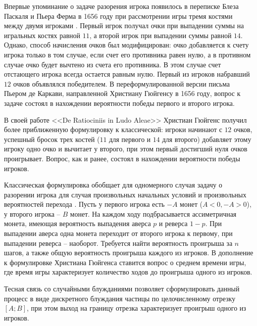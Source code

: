 Впервые упоминание о задаче разорения игрока появилось в переписке Блеза Паскаля и Пьера Ферма в 1656 году при рассмотрении игры тремя костями между двумя игроками \cite{renyi_1980}. Первый игрок получал очки при выпадении суммы на игральных костях равной $11$, а второй игрок при выпадении суммы равной $14$. Однако, способ начисления очков был модифицирован: очко добавляется к счету игрока только в том случае, если счет его противника равен нулю, а в противном случае очко будет вычтено из счета его противника. В этом случае счет отстающего игрока всегда остается равным нулю. Первый из игроков набравший $12$ очков объявлялся победителем. В переформулированной версии письма Пьером де Каркави, направленной Христиану Гюйгенсу в 1656 году, вопрос к задаче состоял в нахождении вероятности победы первого и второго игрока. 

В своей работе <<De Ratiociniis in Ludo Aleae>> Христиан Гюйгенс \cite{hald_history_2003,huygens_christiani_1714} получил более приближенную формулировку к классической: игроки начинают с $12$ очков, успешный бросок  трех костей ($11$ для первого и $14$ для второго) добавляет этому игроку одно очко и вычитает у второго, при этом первый достигший нуля очков проигрывает. Вопрос, как и ранее, состоял в нахождении вероятности победы игроков. 

Классическая формулировка обобщает для одномерного случая задачу о разорении игрока для случая произвольных начальных условий и произвольных вероятностей перехода \cite{feller_introduction_1968}. Пусть у первого игрока есть $-A$ монет ($A < 0, -A > 0$), у второго игрока -- $B$ монет. На каждом ходу подбрасывается ассиметричная монета, имеющая вероятность выпадения аверса $p$ и реверса $1-p$. При выпадении аверса одна монета переходит от второго игрока к первому, при выпадении реверса -- наоборот. Требуется найти вероятность проигрыша за $n$ шагов, а также общую вероятность проигрыша каждого из игроков. В дополнение к формулировке Христиана Гюйгенса ставится вопрос о среднем времени игры, где время игры характеризует количество ходов до проигрыша одного из игроков.

Тесная связь со случайными блужданиями позволяет сформулировать данный процесс в виде дискретного блуждания частицы по целочисленному отрезку $[A; B]$, при этом выход на границу отрезка характеризует проигрыш одного из игроков. \cite{shiryaev_2021} 

